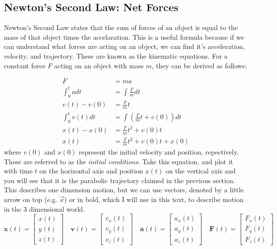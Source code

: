\documentclass[titlepage]{article}
\begin{document}
\subsection{Newton's Second Law: Net Forces}

Newton's Second Law states that the sum of forces of an object is equal to the mass of that object times the accelaration. 
This is a useful formula because if we can understand what forces are acting on an object, we can find it's acceleration, velocity, and trajectory. These are known as the kinematic equations. 
For a constant force $F$ acting on an object with mass $m$, they can be derived as follows:

\begin{align}
    F &= ma  \\
    \int_0^t a dt &= \int \frac{F}{m} dt \\
    v(t) - v(0) &= \frac{F}{m} t \\
    \int_0^t v(t) dt &= \int \left(\frac{F}{m} t + v(0) \right) dt \\
    x(t) - x(0) &= \frac{F}{m}t^2 + v(0) t \\
    x(t) &= \frac{F}{m} t^2 + v(0)t + x(0)
\end{align}
where $v(0)$ and $x(0)$ represent the initial velocity and position, repectively. These are referred to as the \textit{initial conditions}. Take this equation, and plot it with time $t$ on the horizontal axis and position $x(t)$ on the vertical axis and you will see that it is the parabolic trajectory claimed in the previous section. 
This describes one dimension motion, but we can use vectors, denoted by a little arrow on top (e.g. $\vec{x}$) or in bold, which I will use in this text, to describe motion in the 3 dimensional world. 
\begin{equation}
    \mathbf{x}(t) = \begin{bmatrix}
    x(t) \\ y(t) \\ z(t)
    \end{bmatrix} 
    \quad 
    \mathbf{v}(t) = \begin{bmatrix}
        v_x(t)\\ v_y(t) \\ v_z(t)
    \end{bmatrix}
    \quad 
    \mathbf{a}(t) = \begin{bmatrix}
        a_x(t) \\ a_y(t) \\ a_z(t) 
    \end{bmatrix}
    \quad 
    \mathbf{F}(t) = \begin{bmatrix}
        F_x(t) \\ F_y(t) \\ F_z(t)
    \end{bmatrix}
\end{equation}
\end{document}

